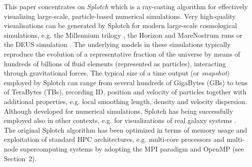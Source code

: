\documentclass[1p]{elsarticle}
\begin{document}
This paper concentrates on {\it Splotch} \cite{2008NJPh...10l5006D} which is a ray-casting algorithm for effectively visualizing large-scale, particle-based numerical simulations. Very high-quality visualisations can be generated by Splotch for modern large-scale cosmological simulations, e.g. the Millennium trilogy \cite{millennium}, the Horizon and MareNostrum runs \cite{horizon} or the DEUS simulation \cite{deus}. The underlying models in these simulations typically reproduce the evolution of a representative fraction of the universe by means of hundreds of billions of fluid elements (represented as particles), interacting through gravitational forces. The typical size of a time output (or {\it snapshot}) employed by Splotch can range from several hundreds of GigaBytes (GBs) to tens of TeraBytes (TBs), recording ID, position and velocity of particles together with additional properties, e.g. local smoothing length, density and velocity dispersion. Although developed for numerical simulations, Splotch has being successfully employed 
also in other contexts, e.g. for visualizations of real galaxy systems \cite{m83-vis}.
The original Splotch algorithm has been optimized in terms of memory usage and exploitation of standard HPC architectures, e.g. multi-core processors and multi-node supercomputing systems by adopting the MPI paradigm \cite{jin:high-performance} and OpenMP (see Section~2).
\end{document}
